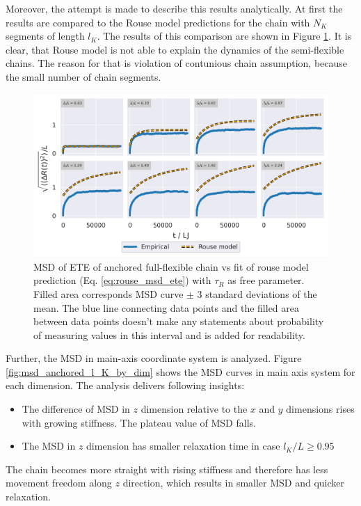 \documentclass[
    paper=A4,pagesize=automedia,fontsize=12pt,
    BCOR=15mm,DIV=22,
    twoside,headinclude,footinclude=false,
    ngerman,fleqn,             %
    bibliography=totocnumbered,          %
    listof=totoc,                %
    listof=flat,                 %
    cleardoublepage=empty      %
    numbers=endperiod
]{scrartcl}
\begin{document}
Moreover, the attempt is made to describe this results analytically. At first
the results are compared to the Rouse model predictions for the chain
with $N_K$ segments of length $l_K$. The results of this comparison are shown
in Figure \ref{fig:msd_anchored_l_K_rouse_fit_anal}. It is clear, that
Rouse model is not able to explain the dynamics of the semi-flexible chains.
The reason for that is violation of contunious chain assumption, because
the small number of chain segments.

\begin{figure}[h]
    \begin{center}
      \includegraphics[width=\columnwidth,trim={0cm 0cm 0cm 0.0cm},clip]{4-exp-delta_R-rouse_anal.png}
      \caption{\label{fig:msd_anchored_l_K_rouse_fit_anal}
      MSD of ETE of anchored full-flexible chain vs fit of rouse model prediction 
      (Eq. \ref{eq:rouse_msd_ete}) with $\tau_R$ as free parameter.
      Filled area corresponds MSD curve $\pm$ 3 standard deviations of the mean. The
      blue line connecting data points and the filled area between data points doesn't make
      any statements about probability of measuring values in this interval and is
      added for readability.
      }
    \end{center}
\end{figure}

Further, the MSD in main-axis coordinate system is analyzed.
Figure \ref{fig:msd_anchored_l_K_by_dim} shows the MSD curves in main axis system
for each dimension. The analysis delivers following insights:
\begin{itemize}
    \item The difference of MSD in $z$ dimension relative to the $x$ and $y$
    dimensions rises with growing stiffness. The plateau value of MSD falls.
    \item The MSD in $z$ dimension has smaller relaxation time in case $l_K/L \ge 0.95$ 
\end{itemize}
The chain becomes more straight with rising stiffness and therefore has less
movement freedom along $z$ direction, which results in smaller MSD and quicker
relaxation.
\end{document}
